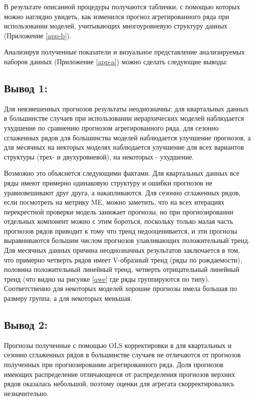 \documentclass[12pt,a4paper, oneside]{extreport}
\begin{document}
В результате описанной процедуры получаются таблички, с помощью которых можно наглядно увидеть, как изменился прогноз агрегированного ряда при использовании моделей, учитывающих многоуровневую  структуру данных (Приложение \ref{app-b}). 

Анализируя полученные показатели и визуальное представление анализируемых наборов данных (Приложение \ref{app-a})  можно сделать следующие выводы:

\subsection*{Вывод 1:}

Для невзвешенных прогнозов результаты неоднозначны: для квартальных данных в большинстве случаев при использовании иерархических моделей наблюдается ухудшение  по сравнению прогнозом агрегированного ряда, для сезонно сглаженных рядов для большинства моделей наблюдается улучшение прогнозов, а для месячных на некторых моделях наблюдается улучшение для всех вариантов структуры (трех- и двухуровневой),   на некоторых - ухудшение.
 
	Возможно это объяснется следующими фактами. Для квартальных данных все ряды имеют примерно одинаковую структуру и  ошибки прогнозов не уравновешивают друг друга, а накапливаются.  Для сезонно сглаженных рядов, если посмотреть на метрику  ME, можно заметить, что на всех итерациях перекрестной проверки модель занижает прогнозы, но при прогнозировании отдельных компонент можно с этим бороться, поскольку только малая часть прогнозов рядов приводит к тому что тренд недооценивается, и эти прогнозы выравниваются большим числом прогнозов улавливающих положительный тренд.     Для месячных данных причина неоднозначных результатов заключается в   том, что примерно четверть рядов имеет V-образный тренд (ряды по рождаемости), половина положительный линейный тренд, четверть отрицательный линейный тренд (что видно на рисунке \ref{qwe}   где ряды группируются по типу).  Соответственно для некоторых моделей хорошие  прогнозы  имела большая по размеру группа, а для некоторых меньшая.
	
	
\subsection*{Вывод 2:}

Прогнозы полученные с помощью OLS  корректировки в для квартальных и сезонно сглаженных рядов в большинстве случаев  не отличаются от прогнозов полученных при прогнозировании агрегированного ряда. Доля  прогнозов имеющих распределение отличающееся от распределения прогнозов верхних рядов оказалась небольшой, поэтому оценки для агрегата скорректировались незначительно.   
\end{document}
